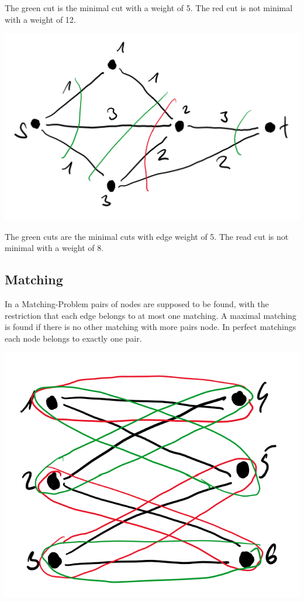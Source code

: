 \documentclass[runningheads]{llncs}
\begin{document}
The green cut is the minimal cut with a weight of 5. The red cut is not minimal with a weight of 12.

\includegraphics[scale=0.5]{./resources/graph_2}

The green cuts are the minimal cuts with edge weight of 5. The read cut is not minimal with a weight of 8.

\subsection*{Matching}
In a Matching-Problem pairs of nodes are supposed to be found, with the restriction that each edge belongs to at most one matching. A maximal matching is found if there is no other matching with more pairs node. In perfect matchings each node belongs to exactly one pair.

\includegraphics[scale=0.5]{./resources/graph_3}
\end{document}
